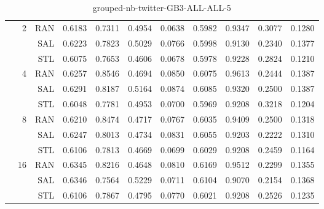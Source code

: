 \begin{center}
\begin{table}[htbp]
\begin{tabular}{ | r | r | r | r | r | r | r | r | r | r | r |}
 & \multirow{3}{*}{2} & RAN & 0.6183 & 0.7311 & 0.4954 & 0.0638 & 0.5982 & 0.9347 & 0.3077 & 0.1280\\ \cline{3-11}
 &   & SAL & 0.6223 & 0.7823 & 0.5029 & 0.0766 & 0.5998 & 0.9130 & 0.2340 & 0.1377\\ \cline{3-11}
 &   & STL & 0.6075 & 0.7653 & 0.4606 & 0.0678 & 0.5978 & 0.9228 & 0.2824 & 0.1210\\ \cline{2-11}
 & \multirow{3}{*}{4} & RAN & 0.6257 & 0.8546 & 0.4694 & 0.0850 & 0.6075 & 0.9613 & 0.2444 & 0.1387\\ \cline{3-11}
 &   & SAL & 0.6291 & 0.8187 & 0.5164 & 0.0874 & 0.6085 & 0.9320 & 0.2500 & 0.1387\\ \cline{3-11}
 &   & STL & 0.6048 & 0.7781 & 0.4953 & 0.0700 & 0.5969 & 0.9208 & 0.3218 & 0.1204\\ \cline{2-11}
 & \multirow{3}{*}{8} & RAN & 0.6210 & 0.8474 & 0.4717 & 0.0767 & 0.6035 & 0.9409 & 0.2500 & 0.1318\\ \cline{3-11}
 &   & SAL & 0.6247 & 0.8013 & 0.4734 & 0.0831 & 0.6055 & 0.9203 & 0.2222 & 0.1310\\ \cline{3-11}
 &   & STL & 0.6106 & 0.7813 & 0.4669 & 0.0699 & 0.6029 & 0.9208 & 0.2459 & 0.1164\\ \cline{2-11}
 & \multirow{3}{*}{16} & RAN & 0.6345 & 0.8216 & 0.4648 & 0.0810 & 0.6169 & 0.9512 & 0.2299 & 0.1355\\ \cline{3-11}
 &   & SAL & 0.6346 & 0.7564 & 0.5229 & 0.0711 & 0.6104 & 0.9070 & 0.2154 & 0.1368\\ \cline{3-11}
 &   & STL & 0.6106 & 0.7867 & 0.4795 & 0.0770 & 0.6021 & 0.9208 & 0.2526 & 0.1235\\ \cline{2-11}
\hline
\end{tabular}
\caption{grouped-nb-twitter-GB3-ALL-ALL-5}
\end{table}
\end{center}

